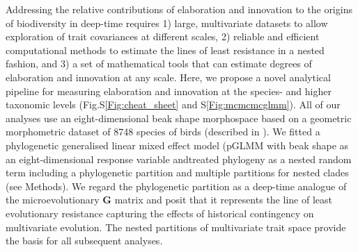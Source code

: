 \documentclass[12pt,letterpaper]{article}
\begin{document}
Addressing the relative contributions of elaboration and innovation to the origins of biodiversity in deep-time requires
1) large, multivariate datasets to allow exploration of trait covariances at different scales,
2) reliable and efficient computational methods to estimate the lines of least resistance in a nested fashion,
and 3) a set of mathematical tools that can estimate degrees of elaboration and innovation at any scale.
Here, we propose a novel analytical pipeline for measuring elaboration and innovation at the species- and higher taxonomic levels (Fig.S\ref{Fig:cheat_sheet} and S\ref{Fig:mcmcmcglmm}).
All of our analyses use an eight-dimensional beak shape morphospace based on a geometric morphometric dataset of 8748 species of birds (described in \cite{hughes2022global}).
We fitted a phylogenetic generalised linear mixed effect model (pGLMM with beak shape as an eight-dimensional response variable andtreated phylogeny as a nested random term including a phylogenetic partition and multiple partitions for nested clades (see Methods).
We regard the phylogenetic partition as a deep-time analogue of the microevolutionary \textbf{G} matrix and posit that it represents the line of least evolutionary resistance capturing the effects of historical contingency on multivariate evolution.
The nested partitions of multivariate trait space provide the basis for all subsequent analyses.
\end{document}
